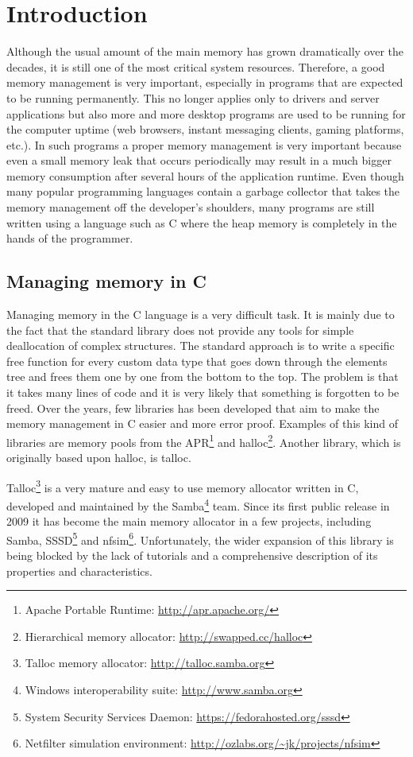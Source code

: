 \chapter{Introduction}

Although the usual amount of the main memory has grown dramatically over the
decades, it is still one of the most critical system resources. Therefore, a
good memory management is very important, especially in programs that are
expected to be running permanently. This no longer applies only to drivers and
server applications but also more and more desktop programs are used to be
running for the computer uptime (web browsers, instant messaging clients,
gaming platforms, etc.). In such programs a proper memory management is very
important because even a small memory leak that occurs periodically may result
in a much bigger memory consumption after several hours of the application
runtime. Even though many popular programming languages contain a garbage
collector that takes the memory management off the developer's shoulders, many
programs are still written using a language such as C where the heap memory is
completely in the hands of the programmer.

\section{Managing memory in C}

Managing memory in the C language is a very difficult task. It is mainly due to
the fact that the standard library does not provide any tools for simple
deallocation of complex structures. The standard approach is to write a
specific free function for every custom data type that goes down through the
elements tree and frees them one by one from the bottom to the top. The problem
is that it takes many lines of code and it is very likely that something is
forgotten to be freed. Over the years, few libraries has been developed that
aim to make the memory management in C easier and more error proof. Examples of
this kind of libraries are memory pools from the APR\footnote{Apache Portable
Runtime: \url{http://apr.apache.org/}} and halloc\footnote{Hierarchical memory
allocator: \url{http://swapped.cc/halloc}}. Another library, which is
originally based upon halloc\cite{MailListOrigin}, is talloc.

Talloc\footnote{Talloc memory allocator: \url{http://talloc.samba.org}} is a
very mature and easy to use memory allocator written in C, developed and
maintained by the Samba\footnote{Windows interoperability suite:
\url{http://www.samba.org}} team. Since its first public release in
2009\cite{MailListOrigin} it has become the main memory allocator in a few
projects, including Samba, SSSD\footnote{System Security Services Daemon:
\url{https://fedorahosted.org/sssd}} and nfsim\footnote{Netfilter simulation
environment: \url{http://ozlabs.org/~jk/projects/nfsim}}. Unfortunately, the
wider expansion of this library is being blocked by the lack of tutorials and a
comprehensive description of its properties and characteristics.

